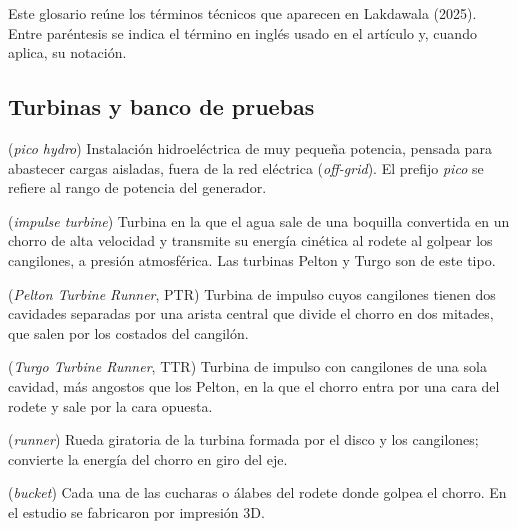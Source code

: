 
Este glosario reúne los términos técnicos que aparecen en Lakdawala (2025). Entre paréntesis se indica el término en inglés usado en el artículo y, cuando aplica, su notación.

\subsection*{Turbinas y banco de pruebas}

\begin{description}[style=nextline, leftmargin=1.2em, itemsep=3pt, font=\normalfont\bfseries\color{verdeOscuroUN}]

\item[Pico central hidroeléctrica] (\textit{pico hydro}) Instalación hidroeléctrica de muy pequeña potencia, pensada para abastecer cargas aisladas, fuera de la red eléctrica (\textit{off-grid}). El prefijo \textit{pico} se refiere al rango de potencia del generador.

\item[Turbina de impulso] (\textit{impulse turbine}) Turbina en la que el agua sale de una boquilla convertida en un chorro de alta velocidad y transmite su energía cinética al rodete al golpear los cangilones, a presión atmosférica. Las turbinas Pelton y Turgo son de este tipo.

\item[Turbina Pelton] (\textit{Pelton Turbine Runner}, PTR) Turbina de impulso cuyos cangilones tienen dos cavidades separadas por una arista central que divide el chorro en dos mitades, que salen por los costados del cangilón.

\item[Turbina Turgo] (\textit{Turgo Turbine Runner}, TTR) Turbina de impulso con cangilones de una sola cavidad, más angostos que los Pelton, en la que el chorro entra por una cara del rodete y sale por la cara opuesta.

\item[Rodete] (\textit{runner}) Rueda giratoria de la turbina formada por el disco y los cangilones; convierte la energía del chorro en giro del eje.

\item[Cangilón] (\textit{bucket}) Cada una de las cucharas o álabes del rodete donde golpea el chorro. En el estudio se fabricaron por impresión 3D.


\end{description}

